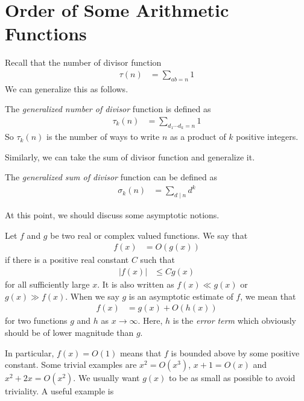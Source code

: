 \documentclass[elemannt.tex]{subfile}
\begin{document}
	\section{Order of Some Arithmetic Functions}
	Recall that the number of divisor function
		\begin{align*}
			\tau(n)
				&  =\sum_{ab=n}1
		\end{align*}
	We can generalize this as follows.
		\begin{definition}
			The \textit{generalized number of divisor} function is defined as
				\begin{align*}
					\tau_{k}(n)
						& = \sum_{d_{1}\cdots d_{k}=n}1
				\end{align*}
			So $\tau_{k}(n)$ is the number of ways to write $n$ as a product of $k$ positive integers.
		\end{definition}
	Similarly, we can take the sum of divisor function and generalize it.
		\begin{definition}
			The \textit{generalized sum of divisor} function can be defined as
				\begin{align*}
					\sigma_{k}(n)
						& = \sum_{d\mid n}d^{k}
				\end{align*}
		\end{definition}
	At this point, we should discuss some asymptotic notions.
		\begin{definition}[Big O]
			Let $f$ and $g$ be two real or complex valued functions. We say that
				\begin{align*}
					f(x)
					& = O(g(x))
				\end{align*}
			if there is a positive real constant $C$ such that
				\begin{align*}
					|f(x)|
					& \leq Cg(x)
				\end{align*}
			for all sufficiently large $x$. It is also written as $f(x)\ll g(x)$  or $g(x)\gg f(x)$. When we say $g$ is an asymptotic estimate of $f$, we mean that
				\begin{align*}
					f(x)
						& = g(x)+O(h(x))
				\end{align*}
			for two functions $g$ and $h$ as $x\to\infty$. Here, $h$ is the \textit{error term} which obviously should be of lower magnitude than $g$.
		\end{definition}
	In particular, $f(x)=O(1)$ means that $f$ is bounded above by some positive constant. Some trivial examples are $x^{2}=O(x^{3})$, $x+1=O(x)$ and $x^{2}+2x=O(x^{2})$. We usually want $g(x)$ to be as small as possible to avoid triviality. A useful example is
\end{document}
